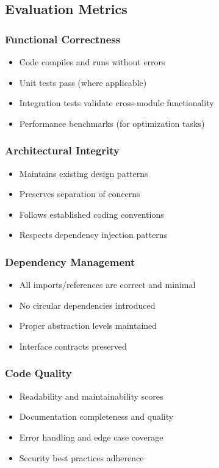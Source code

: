 \documentclass{article}
\begin{document}
\subsection{Evaluation Metrics}

\subsubsection{Functional Correctness}
\begin{itemize}
    \item Code compiles and runs without errors
    \item Unit tests pass (where applicable)
    \item Integration tests validate cross-module functionality
    \item Performance benchmarks (for optimization tasks)
\end{itemize}

\subsubsection{Architectural Integrity}
\begin{itemize}
    \item Maintains existing design patterns
    \item Preserves separation of concerns
    \item Follows established coding conventions
    \item Respects dependency injection patterns
\end{itemize}

\subsubsection{Dependency Management}
\begin{itemize}
    \item All imports/references are correct and minimal
    \item No circular dependencies introduced
    \item Proper abstraction levels maintained
    \item Interface contracts preserved
\end{itemize}

\subsubsection{Code Quality}
\begin{itemize}
    \item Readability and maintainability scores
    \item Documentation completeness and quality
    \item Error handling and edge case coverage
    \item Security best practices adherence
\end{itemize}
\end{document}
